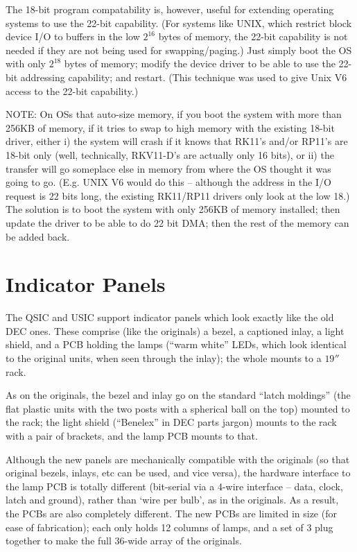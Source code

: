 The 18-bit program compatability is, however, useful for extending operating
systems to use the 22-bit capability. (For systems like UNIX, which restrict
block device I/O to buffers in the low $2^{16}$ bytes of memory, the
22-bit capability is not needed if they are not being used for swapping/paging.)
Just simply boot the OS with only $2^{18}$ bytes of memory; modify the device
driver to be able to use the 22-bit addressing capability; and restart. (This
technique was used to give Unix V6 access to the 22-bit capability.)

NOTE: On OSs that auto-size memory, if you boot the system with more than
256KB of memory, if it tries to swap to high memory with the existing 18-bit
driver, either i) the system will crash if it knows that RK11's and/or RP11's
are 18-bit only (well, technically, RKV11-D's are actually only 16 bits), or
ii) the transfer will go someplace else in memory from where the OS thought
it was going to go. (E.g. UNIX V6 would do this -- although the address in the
I/O request is 22 bits long, the existing RK11/RP11 drivers only look at the
low 18.) The solution is to boot the system with only 256KB of memory
installed; then update the driver to be able to do 22 bit DMA; then the rest
of the memory can be added back.


\chapter{Indicator Panels}

The QSIC and USIC support indicator panels which look exactly like the old
DEC ones. These comprise (like the originals) a bezel, a captioned inlay, a
light shield, and a PCB holding the lamps (``warm white'' LEDs, which look
identical to the original units, when seen through the inlay); the whole
mounts to a $19''$ rack.

As on the originals, the bezel and inlay go on the standard ``latch moldings''
(the flat plastic units with the two posts with a spherical ball on the top)
mounted to the rack; the light shield (``Benelex'' in DEC parts jargon) mounts
to the rack with a pair of brackets, and the lamp PCB mounts to that.

Although the new panels are mechanically compatible with the originals (so
that original bezels, inlays, etc can be used, and vice versa), the hardware
interface to the lamp PCB is totally different (bit-serial via a 4-wire
interface -- data, clock, latch and ground), rather than `wire per bulb', as
in the originals. As a result, the PCBs are also completely different. The
new PCBs are limited in size (for ease of fabrication); each only holds 12
columns of lamps, and a set of 3 plug together to make the full 36-wide array
of the originals.

